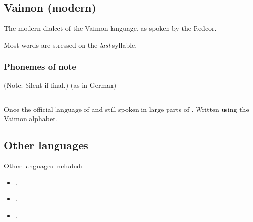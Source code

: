 \subsection{Vaimon (modern)}
The modern dialect of the Vaimon language, as spoken by the Redcor. 

Most words are stressed on the \emph{last} syllable. 





\begin{pronunciationenvironment}{\subsubsection{Phonemes of note}}
   (Note: Silent if final.)
   (as in German)
\end{pronunciationenvironment}














\subsection{\Velcadian}
Once the official language of  and still spoken in large parts of \Velcad. 
Written using the Vaimon alphabet. 
















\subsection{Other languages}
Other languages included:
\begin{itemize}
  \item {}.
  \item {}.
  \item {}.
\end{itemize}










